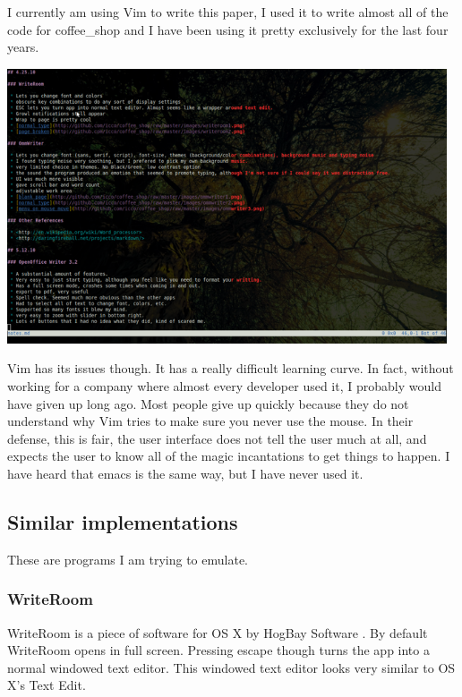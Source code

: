 \documentclass[11pt]{article}
\begin{document}
I currently am using Vim to write this paper, I used it to write almost all of the code for coffee\_shop and I have been using it pretty exclusively for the last four years.

\includegraphics[width=130mm]{images/vim3.png}

Vim has its issues though. It has a really difficult learning curve. In fact, without working for a company where almost every developer used it, I probably would have given up long ago. Most people give up quickly because they do not understand why Vim tries to make sure you never use the mouse. In their defense, this is fair, the user interface does not tell the user much at all, and expects the user to know all of the magic incantations to get things to happen. I have heard that emacs is the same way, but I have never used it.

\subsection{Similar implementations}

These are programs I am trying to emulate.

\subsubsection{WriteRoom}

WriteRoom is a piece of software for OS X by HogBay Software \cite{writeroom}. By default WriteRoom opens in full screen. Pressing escape though turns the app into a normal windowed text editor. This windowed text editor looks very similar to OS X's Text Edit.
\end{document}
